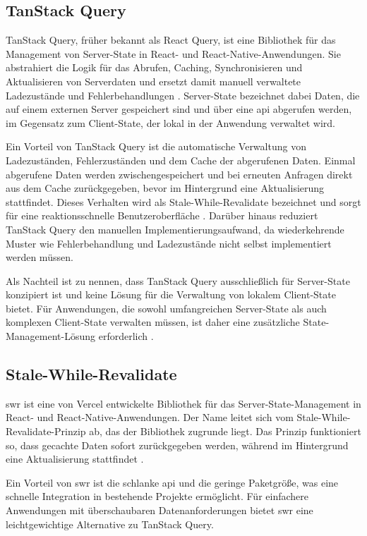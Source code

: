 \subsection{TanStack Query}

TanStack Query, früher bekannt als React Query, ist eine Bibliothek 
für das Management von Server-State in React- und React-Native-Anwendungen. 
Sie abstrahiert die Logik für das Abrufen, Caching, Synchronisieren und 
Aktualisieren von Serverdaten und ersetzt damit manuell verwaltete 
Ladezustände und Fehlerbehandlungen \cite{tanstack-query-docs}. 
Server-State bezeichnet dabei Daten, die auf einem externen Server 
gespeichert sind und über eine \gls{api} abgerufen werden, im Gegensatz zum 
Client-State, der lokal in der Anwendung verwaltet wird.

Ein Vorteil von TanStack Query ist die automatische Verwaltung von 
Ladezuständen, Fehlerzuständen und dem Cache der abgerufenen Daten. 
Einmal abgerufene Daten werden zwischengespeichert und bei erneuten 
Anfragen direkt aus dem Cache zurückgegeben, bevor im Hintergrund eine 
Aktualisierung stattfindet. Dieses Verhalten wird als 
Stale-While-Revalidate bezeichnet und sorgt für eine reaktionsschnelle 
Benutzeroberfläche \cite{tanstack-query-docs}. Darüber hinaus reduziert 
TanStack Query den manuellen Implementierungsaufwand, da 
wiederkehrende Muster wie Fehlerbehandlung und Ladezustände nicht 
selbst implementiert werden müssen.

Als Nachteil ist zu nennen, dass TanStack Query ausschließlich für 
Server-State konzipiert ist und keine Lösung für die Verwaltung von 
lokalem Client-State bietet. Für Anwendungen, die sowohl umfangreichen 
Server-State als auch komplexen Client-State verwalten müssen, ist 
daher eine zusätzliche State-Management-Lösung erforderlich \cite{tanstack-query-docs}.

\subsection{Stale-While-Revalidate}

\gls{swr} ist eine von Vercel entwickelte Bibliothek für das Server-State-Management in React- und React-Native-Anwendungen. Der Name leitet sich vom Stale-While-Revalidate-Prinzip ab, das der Bibliothek zugrunde liegt. Das Prinzip funktioniert so, dass gecachte Daten sofort zurückgegeben werden, während im Hintergrund eine Aktualisierung stattfindet \cite{swr-docs}.

Ein Vorteil von \gls{swr} ist die schlanke \gls{api} und die geringe Paketgröße, was eine schnelle Integration in bestehende Projekte ermöglicht. Für einfachere Anwendungen mit überschaubaren Datenanforderungen bietet \gls{swr} eine leichtgewichtige Alternative zu TanStack Query.

